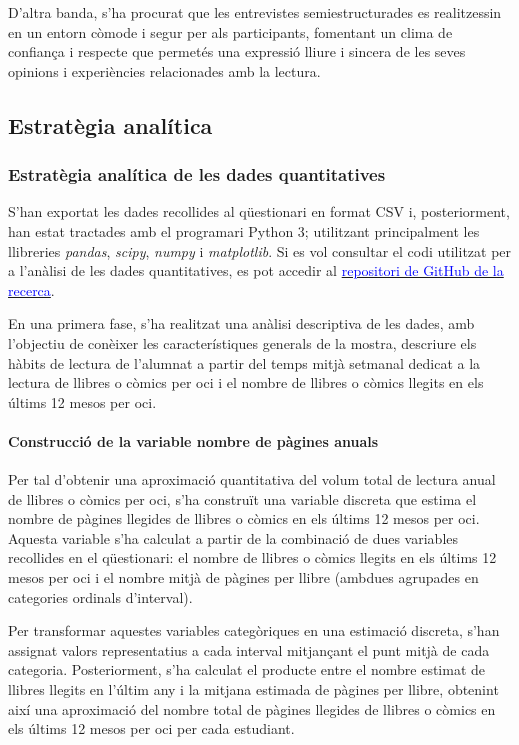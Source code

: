 \documentclass[12pt]{article}
\begin{document}
D'altra banda, s'ha procurat que les entrevistes semiestructurades es realitzessin en un entorn còmode i segur per als participants, fomentant un clima de confiança i respecte que permetés una expressió lliure i sincera de les seves opinions i experiències relacionades amb la lectura.

\subsection{Estratègia analítica}
\subsubsection{Estratègia analítica de les dades quantitatives}

S'han exportat les dades recollides al qüestionari en format CSV i, posteriorment, han estat tractades amb el programari Python 3; utilitzant principalment les llibreries \emph{pandas}, \emph{scipy}, \emph{numpy} i \emph{matplotlib}. Si es vol consultar el codi utilitzat per a l'anàlisi de les dades quantitatives, es pot accedir al \href{https://github.com/titocampis/tfm-habits-lectura.git}{\textcolor{blue}{repositori de GitHub de la recerca}}.

En una primera fase, s'ha realitzat una anàlisi descriptiva de les dades, amb l'objectiu de conèixer les característiques generals de la mostra, descriure els hàbits de lectura de l'alumnat a partir del temps mitjà setmanal dedicat a la lectura de llibres o còmics per oci i el nombre de llibres o còmics llegits en els últims 12 mesos per oci.

\paragraph{Construcció de la variable nombre de pàgines anuals}

Per tal d’obtenir una aproximació quantitativa del volum total de lectura anual de llibres o còmics per oci, s’ha construït una variable discreta que estima el nombre de pàgines llegides de llibres o còmics en els últims 12 mesos per oci. Aquesta variable s’ha calculat a partir de la combinació de dues variables recollides en el qüestionari: el nombre de llibres o còmics llegits en els últims 12 mesos per oci i el nombre mitjà de pàgines per llibre (ambdues agrupades en categories ordinals d'interval).

Per transformar aquestes variables categòriques en una estimació discreta, s’han assignat valors representatius a cada interval mitjançant el punt mitjà de cada categoria. Posteriorment, s’ha calculat el producte entre el nombre estimat de llibres llegits en l'últim any i la mitjana estimada de pàgines per llibre, obtenint així una aproximació del nombre total de pàgines llegides de llibres o còmics en els últims 12 mesos per oci per cada estudiant.
\end{document}
